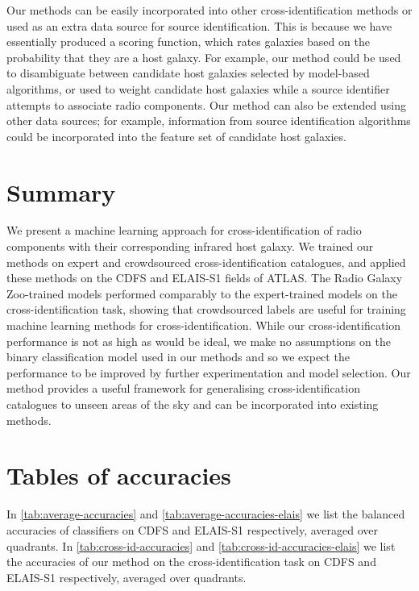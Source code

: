 \documentclass[fleqn,usenatbib,usedcolumn]{mnras}
\begin{document}
  Our methods can be easily incorporated into other cross-identification
  methods or used as an extra data source for source identification. This is
  because we have essentially produced a scoring function, which rates
  galaxies based on the probability that they are a host galaxy. For
  example, our method could be used to disambiguate between candidate host
  galaxies selected by model-based algorithms, or used to weight candidate
  host galaxies while a source identifier attempts to associate radio
  components. Our method can also be extended using other data sources; for
  example, information from source identification algorithms could be
  incorporated into the feature set of candidate host galaxies.

\section{Summary}

  We present a machine learning approach for cross-identification of radio
  components with their corresponding infrared host galaxy. We trained our
  methods on expert and crowdsourced cross-identification catalogues, and
  applied these methods on the CDFS and ELAIS-S1 fields of ATLAS. The Radio
  Galaxy Zoo-trained models performed comparably to the expert-trained models
  on the cross-identification task, showing that crowdsourced labels are
  useful for training machine learning methods for cross-identification. While
  our cross-identification performance is not as high as would be ideal, we
  make no assumptions on the binary classification model used in our methods
  and so we expect the performance to be improved by further experimentation
  and model selection. Our method provides a useful framework for generalising
  cross-identification catalogues to unseen areas of the sky and can be
  incorporated into existing methods.

%



\clearpage
\appendix
\section{Tables of accuracies}

In \autoref{tab:average-accuracies} and \autoref{tab:average-accuracies-elais}
we list the balanced accuracies of classifiers on CDFS and ELAIS-S1
respectively, averaged over quadrants. In \autoref{tab:cross-id-accuracies}
and \autoref{tab:cross-id-accuracies-elais} we list the accuracies of our
method on the cross-identification task on CDFS and ELAIS-S1 respectively,
averaged over quadrants.
\end{document}
